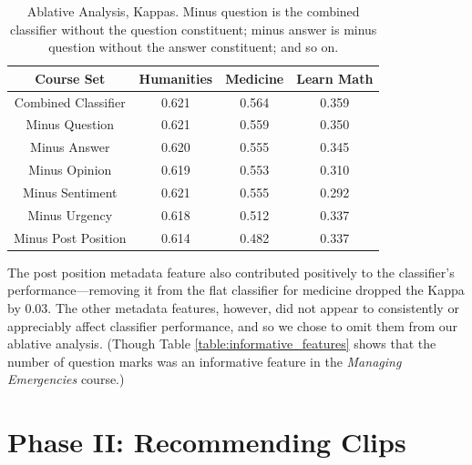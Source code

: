 \documentclass{edm_template}
\begin{document}
\begin{table}[t]
       \centering
       \begin{tabular}{|c|c|c|c|}
       \hline
       Course Set           & Humanities & Medicine & Learn Math \\ \hline
       Combined Classifier  & 0.621      & 0.564    & 0.359 \\ \hline\hline
       Minus Question       & 0.621      & 0.559    & 0.350 \\ \hline
       Minus Answer         & 0.620      & 0.555    & 0.345 \\ \hline
       Minus Opinion        & 0.619      & 0.553    & 0.310 \\ \hline
       Minus Sentiment      & 0.621      & 0.555    & 0.292 \\ \hline
       Minus Urgency        & 0.618      & 0.512    & 0.337 \\ \hline
       Minus Post Position      & 0.614      & 0.482    & 0.337 \\ \hline
       \end{tabular}
       \caption{\textnormal{
       Ablative Analysis, Kappas. Minus question is the combined classifier without the question constituent; minus answer is minus question without the answer constituent; and so on. 
       }} %
       \label{table:ablative} %
\end{table}

The post position metadata feature also contributed positively to the classifier's performance---removing it from the flat classifier for medicine dropped the Kappa by 0.03. The other metadata features, however, did not appear to consistently or appreciably affect classifier performance, and so we chose to omit them from our ablative analysis. (Though Table \ref{table:informative_features} shows that the number of question marks was  an informative feature in the \emph{Managing Emergencies} course.)

\section{Phase II: Recommending Clips}
\label{sec:clipRecommendation}
\vspace{1mm}
\end{document}
